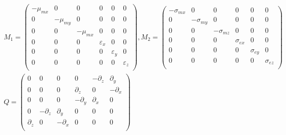 \documentclass[pdftex,a4paper,parskip,listof=totoc,bibliography=totoc,onehalfspacing,12pt]{scrreprt}
\begin{document}
\begin{equation}
\begin{align}
\begin{split}
& M_1 =
 \begin{pmatrix}
   -\mu_{mx}       & 0         & 0         & 0         & 0         & 0       \\
   0          & -\mu_{my}      & 0         & 0         & 0         & 0        \\
   0          & 0         & -\mu_{mx}      & 0         & 0         & 0        \\
   0          & 0         & 0         & \varepsilon_{x}      & 0         & 0        \\
   0          & 0         & 0         & 0         & \varepsilon_{y}      & 0        \\
   0          & 0         & 0         & 0         & 0         & \varepsilon_{z}     \\
 \end{pmatrix}, 
 M_2 =
 \begin{pmatrix}
   -\sigma_{mx}       & 0         & 0         & 0         & 0         & 0       \\
   0          & -\sigma_{my}      & 0         & 0         & 0         & 0        \\
   0          & 0         & -\sigma_{mz}      & 0         & 0         & 0        \\
   0          & 0         & 0         & \sigma_{ex}      & 0         & 0        \\
   0          & 0         & 0         & 0         & \sigma_{ey}      & 0        \\
   0          & 0         & 0         & 0         & 0         & \sigma_{ez}     \\
 \end{pmatrix} \\
& Q = 
 \begin{pmatrix}
   0          & 0         & 0         & 0 	  	& -\partial_{z}	& \partial_{y}   \\
   0          & 0         & 0         & \partial_{z} 	& 0 	      	& -\partial_{x}  \\
   0          & 0         & 0         & -\partial_{y}	& \partial_{x} 	& 0	      \\
   0 	  	& -\partial_{z}	& \partial_{y}        & 0         & 0         & 0        \\
   \partial_{z} 	& 0 	      	& -\partial_{x}       & 0 	       & 0         & 0        \\

\end{pmatrix}
\end{split}
\end{align}
\end{equation}
\end{document}
